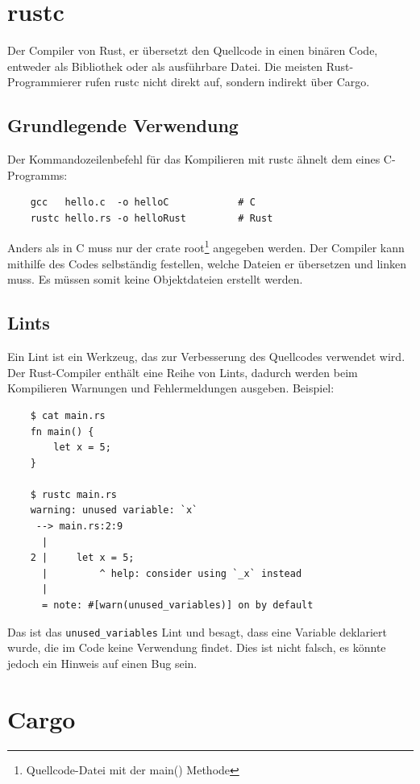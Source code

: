 \section{rustc}

Der Compiler von Rust, er übersetzt den Quellcode in einen binären Code, entweder als Bibliothek oder als ausführbare Datei. Die meisten Rust-Programmierer rufen rustc nicht direkt auf, sondern indirekt über Cargo. \cite{RustcBook}

\subsection{Grundlegende Verwendung}

Der Kommandozeilenbefehl für das Kompilieren mit rustc ähnelt dem eines C-Programms:

\begin{lstlisting}
    gcc   hello.c  -o helloC            # C
    rustc hello.rs -o helloRust         # Rust
\end{lstlisting}

Anders als in C muss nur der crate root\footnote{Quellcode-Datei mit der main() Methode} angegeben werden. Der Compiler kann mithilfe des Codes selbständig festellen, welche Dateien er übersetzen und linken muss. Es müssen somit keine Objektdateien erstellt werden.

\subsection{Lints}

Ein Lint ist ein Werkzeug, das zur Verbesserung des Quellcodes verwendet wird. Der Rust-Compiler enthält eine Reihe von Lints, dadurch werden beim Kompilieren Warnungen und Fehlermeldungen ausgeben. Beispiel:

\begin{lstlisting}
    $ cat main.rs
    fn main() {
        let x = 5;
    }

    $ rustc main.rs
    warning: unused variable: `x`
     --> main.rs:2:9
      |
    2 |     let x = 5;
      |         ^ help: consider using `_x` instead
      |
      = note: #[warn(unused_variables)] on by default
\end{lstlisting}

Das ist das \verb"unused_variables" Lint und besagt, dass eine Variable deklariert wurde, die im Code keine Verwendung findet. Dies ist nicht falsch, es könnte jedoch ein Hinweis auf einen Bug sein.


\section{Cargo}

